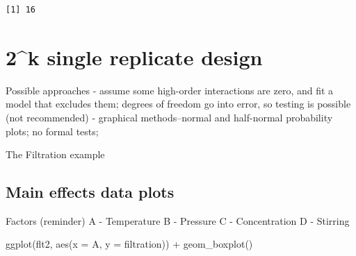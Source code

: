 \documentclass[
]{book}
\newenvironment{Shaded}{\begin{snugshade}}{\end{snugshade}}
\newcommand{\AttributeTok}[1]{\textcolor[rgb]{0.77,0.63,0.00}{#1}}
\newcommand{\CommentTok}[1]{\textcolor[rgb]{0.56,0.35,0.01}{\textit{#1}}}
\newcommand{\DecValTok}[1]{\textcolor[rgb]{0.00,0.00,0.81}{#1}}
\newcommand{\FunctionTok}[1]{\textcolor[rgb]{0.00,0.00,0.00}{#1}}
\newcommand{\NormalTok}[1]{#1}
\newcommand{\OtherTok}[1]{\textcolor[rgb]{0.56,0.35,0.01}{#1}}
\newcommand{\SpecialCharTok}[1]{\textcolor[rgb]{0.00,0.00,0.00}{#1}}
\newcommand{\StringTok}[1]{\textcolor[rgb]{0.31,0.60,0.02}{#1}}
\begin{document}
\begin{verbatim}
[1] 16
\end{verbatim}

\hypertarget{k-single-replicate-design}{%
\section{2\^{}k single replicate design}\label{k-single-replicate-design}}

Possible approaches
- assume some high-order interactions are zero, and fit a model that excludes them; degrees of freedom go into error, so testing is possible (not recommended)
- graphical methods--normal and half-normal probability plots; no formal tests;

The Filtration example

\begin{Shaded}
\end{Shaded}

\hypertarget{main-effects-data-plots}{%
\subsection{Main effects data plots}\label{main-effects-data-plots}}

Factors (reminder)
A - Temperature
B - Pressure
C - Concentration
D - Stirring

\begin{Shaded}
\begin{Highlighting}[]
\FunctionTok{ggplot}\NormalTok{(flt2, }\FunctionTok{aes}\NormalTok{(}\AttributeTok{x =}\NormalTok{ A, }\AttributeTok{y =}\NormalTok{ filtration)) }\SpecialCharTok{+}
  \FunctionTok{geom\_boxplot}\NormalTok{()}
\end{Highlighting}
\end{Shaded}
\end{document}
